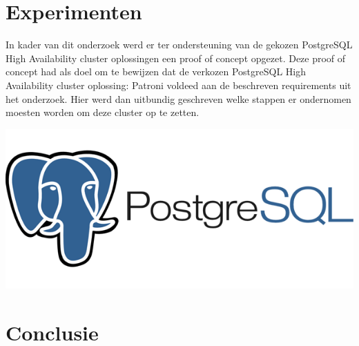 \documentclass[a0,portrait]{a0poster}
\begin{document}
\begin{multicols}{2}

\color{Black} %
\color{HoGentAccent1} 
\section*{Experimenten}
\color{black}
In kader van dit onderzoek werd er ter ondersteuning van de gekozen PostgreSQL High Availability cluster oplossingen een proof of concept opgezet. Deze proof of concept had als doel om te bewijzen dat de verkozen PostgreSQL High Availability cluster oplossing: Patroni voldeed aan de beschreven requirements uit het onderzoek.
Hier werd dan uitbundig geschreven welke stappen er ondernomen moesten worden om deze cluster op te zetten.




\begin{center}\vspace{1cm}
\includegraphics[width=1.0\linewidth]{postgres}
\end{center}\vspace{1cm}




\color{HoGentAccent1} 
\section*{Conclusie}
\color{black}


\end{multicols}
\end{document}
